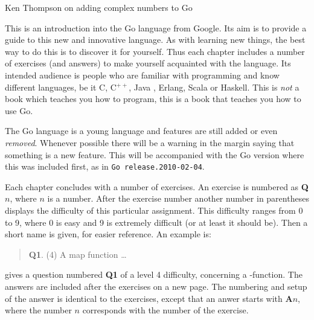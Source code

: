 {Ken Thompson on adding complex numbers to Go}

\noindent{}This is an introduction into the Go language from Google. Its aim
is to provide a guide to this new and innovative language. As with
learning new things, the best way to do this is to discover it for
yourself. Thus each chapter includes a number of exercises (and answers)
to make yourself acquainted with the language.
Its intended audience is people who are familiar with programming
and know different languages, be it C\cite{c}, C$^{++}$\cite{c++}, 
Java \cite{java}, Erlang\cite{erlang}, Scala\cite{scala} or
Haskell\cite{haskell}. This is \emph{not} a book which teaches you how to 
program, this is a book that teaches you how to use Go.

\begin{lbar}
\noindent The Go language is a young language and
features are still added or even \emph{removed}. Whenever
possible there will be a warning in the margin saying that
something is a new feature. This will be accompanied with
the Go version where this was included first, as in
\texttt{\tiny{}Go release.2010-02-04}.
\end{lbar}

Each chapter concludes with a number of exercises. An exercise
is numbered as \textbf{Q$n$}, where $n$ is a number. After the
exercise number another number in parentheses displays the difficulty
of this particular assignment. This difficulty ranges from 0 to 9, where
0 is easy and 9 is extremely difficult (or at least it should be).
Then a short name is given, for easier reference.
An example is:
\begin{verse}
\textbf{Q1}. (4) A map function \ldots
\end{verse}
    
\noindent gives a question numbered \textbf{Q1} of a level 4 difficulty, concerning a
-function. The answers are included after the exercises on a
new page.
The numbering and setup of the answer is identical to the
exercises, except that an anwer starts with \textbf{A$n$}, where the
number $n$ corresponds with the number of the exercise.

